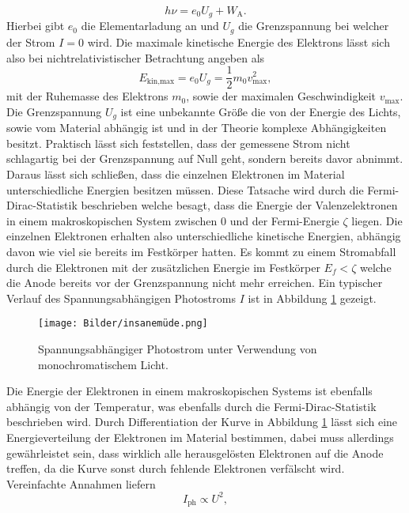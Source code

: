 \begin{equation}
    h \nu = e_{0} U_{g} + W_{\text{A}}.
\end{equation}
Hierbei gibt $e_{0}$ die Elementarladung an und $U_{g}$ die Grenzspannung bei welcher der Strom $I = 0$ wird. Die maximale kinetische Energie des Elektrons lässt sich also bei nichtrelativistischer Betrachtung angeben als
\begin{equation*}
    E_{\text{kin,max}} = e_{0} U_{g} = \frac{1}{2} m_{0} v_{\text{max}}^2,
\end{equation*}
mit der Ruhemasse des Elektrons $m_{0}$, sowie der maximalen Geschwindigkeit $v_{\text{max}}$.
Die Grenzspannung $U_{g}$ ist eine unbekannte Größe die von der Energie des Lichts, sowie vom Material abhängig ist und in der Theorie komplexe Abhängigkeiten besitzt. Praktisch lässt sich feststellen, dass der gemessene Strom nicht schlagartig bei der 
Grenzspannung auf Null geht, sondern bereits davor abnimmt. Daraus lässt sich schließen, dass die einzelnen Elektronen im Material unterschiedliche Energien besitzen müssen. Diese Tatsache wird durch die Fermi-Dirac-Statistik beschrieben welche besagt,
dass die Energie der Valenzelektronen in einem makroskopischen System zwischen $0$ und der Fermi-Energie $\zeta$ liegen. Die einzelnen Elektronen erhalten also unterschiedliche kinetische Energien, abhängig davon wie viel sie bereits im Festkörper hatten. Es kommt zu einem Stromabfall 
durch die Elektronen mit der zusätzlichen Energie im Festkörper $E_{f} < \zeta$ welche die Anode bereits vor der Grenzspannung nicht mehr erreichen.
Ein typischer Verlauf des Spannungsabhängigen Photostroms $I$ ist in Abbildung \ref{fig:fermishit} gezeigt.
\begin{figure}
    \centering
    \texttt{[image: Bilder/insanemüde.png]}
    \caption{Spannungsabhängiger Photostrom unter Verwendung von monochromatischem Licht. \cite{skript}} 
    \label{fig:fermishit}
\end{figure}
Die Energie der Elektronen in einem makroskopischen Systems ist ebenfalls abhängig von der Temperatur, was ebenfalls durch die Fermi-Dirac-Statistik beschrieben wird. Durch Differentiation der Kurve in Abbildung \ref{fig:fermishit} lässt sich eine 
Energieverteilung der Elektronen im Material bestimmen, dabei muss allerdings gewährleistet sein, dass wirklich alle herausgelösten Elektronen auf die Anode treffen, da die Kurve sonst durch fehlende Elektronen verfälscht wird.
Vereinfachte Annahmen liefern 
\begin{equation}
I_{\text{ph}} \propto U^2,
\end{equation}
